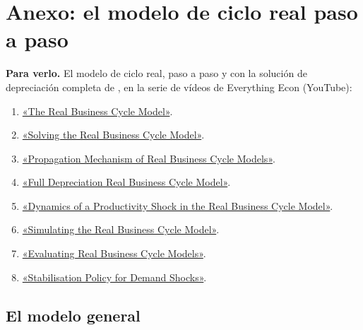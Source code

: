 \documentclass[11pt]{article}
\begin{document}
\section{Anexo: el modelo de ciclo real paso a paso}\label{anexo:rbc}

\begin{anotaciones}
\textbf{Para verlo.} El modelo de ciclo real, paso a paso y con la solución de depreciación completa de , en la serie de vídeos de Everything Econ (YouTube):
\begin{enumerate}
\item \href{https://youtu.be/DZ6dRQwpJ5k?list=PLJkKr2vQrC4Xt-w7vQW33KdnXgSblwr6x}{«The Real Business Cycle Model»}.
\item \href{https://youtu.be/CMFnfklu6qU?list=PLJkKr2vQrC4Xt-w7vQW33KdnXgSblwr6x}{«Solving the Real Business Cycle Model»}.
\item \href{https://youtu.be/N06SnJs517U?list=PLJkKr2vQrC4Xt-w7vQW33KdnXgSblwr6x}{«Propagation Mechanism of Real Business Cycle Models»}.
\item \href{https://youtu.be/W8Ai76iVOtg?list=PLJkKr2vQrC4Xt-w7vQW33KdnXgSblwr6x}{«Full Depreciation Real Business Cycle Model»}.
\item \href{https://youtu.be/Jeyvr0jY5uo?list=PLJkKr2vQrC4Xt-w7vQW33KdnXgSblwr6x}{«Dynamics of a Productivity Shock in the Real Business Cycle Model»}.
\item \href{https://youtu.be/HGKI6chUO6I?list=PLJkKr2vQrC4Xt-w7vQW33KdnXgSblwr6x}{«Simulating the Real Business Cycle Model»}.
\item \href{https://youtu.be/KhuG2sawkvg?list=PLJkKr2vQrC4Xt-w7vQW33KdnXgSblwr6x}{«Evaluating Real Business Cycle Models»}.
\item \href{https://youtu.be/wGSpvb4VSM8?list=PLJkKr2vQrC4Xt-w7vQW33KdnXgSblwr6x}{«Stabilisation Policy for Demand Shocks»}.
\end{enumerate}
\end{anotaciones}

\subsection{El modelo general}
\end{document}
